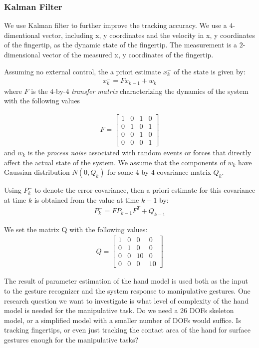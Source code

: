 \subsubsection{Kalman Filter}
We use Kalman filter to further improve the tracking accuracy. We use a
$4$-dimentional vector, including x, y coordinates and the velocity in x, y
coordinates of the fingertip, as the dynamic state of the fingertip.
The measurement is a $2$-dimensional vector of the measured x, y
coordinates of the fingertip. 

Assuming no external control, the a priori estimate $x_k^-$ of the state is
given by:
\begin{align*}
x_k^- = Fx_{k - 1} + w_k
\end{align*}
where $F$ is the $4$-by-$4$ \textit{transfer matrix} characterizing the
dynamics of the system with the following values

\begin{align*}
F = \left[ \begin{array}{cccc}
	1 & 0 & 1 & 0 \\
	0 & 1 & 0 & 1 \\
	0 & 0 & 1 & 0 \\
	0 & 0 & 0 & 1 \end{array} \right]
\end{align*}
and $w_k$ is the \textit{process noise} associated with random events or forces
that directly affect the actual state of the system. We assume that the 
components of $w_k$ have Gaussian distribution $N(0, Q_k)$ for some $4$-by-$4$ 
covariance matrix $Q_k$.

Using $P_k^-$ to denote the error covariance, then a priori estimate for this
covariance at time $k$ is obtained from the value at time $k - 1$ by:
\begin{align*}
P_k^- = FP_{k - 1}F^T + Q_{k - 1}
\end{align*}

We set the matrix Q with the following values:
\begin{align*}
Q = \left[ \begin{array}{cccc}
	1 & 0 & 0 & 0 \\
	0 & 1 & 0 & 0 \\
	0 & 0 & 10 & 0 \\
	0 & 0 & 0 & 10 \end{array} \right]
\end{align*}
  
The result of parameter estimation of the hand model is used both as the input
to the gesture recognizer and the system response to manipulative gestures. One
research question we want to investigate is what level of complexity of the
hand model is needed for the manipulative task. Do we need a 26 DOFs skeleton
model, or a simplified model with a smaller number of DOFs would suffice. Is
tracking fingertips, or even just tracking the contact area of the hand for
surface gestures enough for the manipulative tasks?

